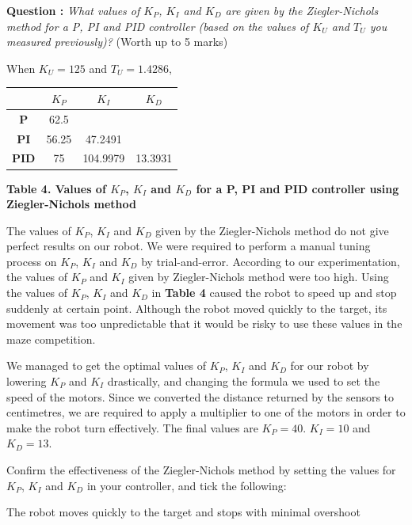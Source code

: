 \documentclass[hidelinks,a4paper,11pt]{article}
\newcommand{\cmark}{\ding{51}}%
\newcommand{\done}{\rlap{$\square$}{\raisebox{2pt}{\large\hspace{1pt}\cmark}}
\hspace{-2.5pt}}
\newcounter{question}
\newcommand\myq{\refstepcounter{question}\thequestion}
\begin{document}
{\bfseries Question \myq:}  \emph{What values of $K_P$, $K_I$ and $K_D$ are given by the
Ziegler-Nichols method for a P, PI and PID controller (based on the values of $K_U$ and $T_U$ you
measured previously)?} (Worth up to 5 marks)\\
\begin{mdframed}
When $K_U = 125$ and $T_U = 1.4286$,
\begin{center}
	\begin{tabular}{ | c | c | c | c | } \hline
		 & \bf{$K_P$} & \bf{$K_I$} & \bf{$K_D$} \\ \hline
		\bf{P} & 62.5 &  &  \\ \hline
		\bf{PI} & 56.25 & 47.2491 &  \\ \hline
		\bf{PID} & 75 & 104.9979 & 13.3931 \\ \hline
	\end{tabular}
\end{center}
\vspace{3mm}
\begin{center}
\textbf{Table 4. Values of $K_P$, $K_I$ and $K_D$ for a P, PI and PID controller using Ziegler-Nichols method}
\end{center}

The values of $K_P$, $K_I$ and $K_D$ given by the Ziegler-Nichols method do not give perfect results
on our robot. We were required to perform a manual tuning process on $K_P$, $K_I$ and $K_D$ by
trial-and-error. According to our experimentation, the values of $K_P$ and $K_I$ given by
Ziegler-Nichols method were too high. Using the values of $K_P$, $K_I$ and $K_D$ in \textbf{Table 4}
caused the robot to  speed up and stop suddenly at certain point. Although the robot moved quickly
to the target, its movement was too unpredictable that it would be risky to use these values in the
maze competition.

\par We managed to get the optimal values of $K_P$, $K_I$ and $K_D$ for our robot by lowering $K_P$
and $K_I$ drastically, and changing the formula we used to set the speed of the motors. Since we
converted the distance returned by the sensors to centimetres, we are required to apply a multiplier
to one of the motors in order to make the robot turn effectively. The final values are $K_P = 40$.
$K_I = 10$ and $K_D = 13$.
\end{mdframed}
\vspace*{\baselineskip}

Confirm the effectiveness of the Ziegler-Nichols method by setting the values for $K_P$, $K_I$ and
$K_D$ in your controller, and tick the following:
\begin{todolist}
	\item[\done] The robot moves quickly to the target and stops with minimal overshoot
 \end{todolist}
\end{document}
